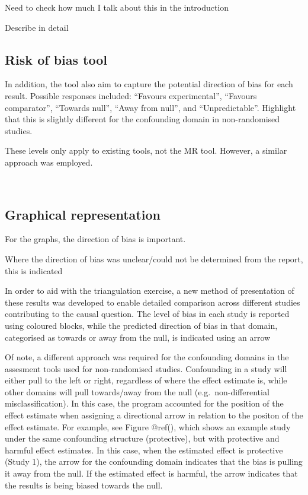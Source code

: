 \documentclass[a4paper, twoside]{templates/ociamthesis}
\begin{document}
Need to check how much I talk about this in the introduction

Describe in detail

\hypertarget{risk-of-bias-tool}{%
\subsection{Risk of bias tool}\label{risk-of-bias-tool}}

In addition, the tool also aim to capture the potential direction of bias for each result. Possible responses included: ``Favours experimental'', ``Favours comparator'', ``Towards null'', ``Away from null'', and ``Unpredictable''. Highlight that this is slightly different for the confounding domain in non-randomised studies.

These levels only apply to existing tools, not the MR tool. However, a similar approach was employed.

~

\hypertarget{graphical-representation}{%
\subsection{Graphical representation}\label{graphical-representation}}

For the graphs, the direction of bias is important.

Where the direction of bias was unclear/could not be determined from the report, this is indicated

In order to aid with the triangulation exercise, a new method of presentation of these results was developed to enable detailed comparison across different studies contributing to the causal question.
The level of bias in each study is reported using coloured blocks, while the predicted direction of bias in that domain, categorised as towards or away from the null, is indicated using an arrow

Of note, a different approach was required for the confounding domains in the assesment tools used for non-randomised studies. Confounding in a study will either pull to the left or right, regardless of where the effect estimate is, while other domains will pull towards/away from the null (e.g.~non-differential misclassification). In this case, the program accounted for the position of the effect estimate when assigning a directional arrow in relation to the positon of the effect estimate.
For example, see Figure @ref(), which shows an example study under the same confounding structure (protective), but with protective and harmful effect estimates. In this case, when the estimated effect is protective (Study 1), the arrow for the confounding domain indicates that the bias is pulling it away from the null. If the estimated effect is harmful, the arrow indicates that the results is being biased towards the null.
\end{document}
